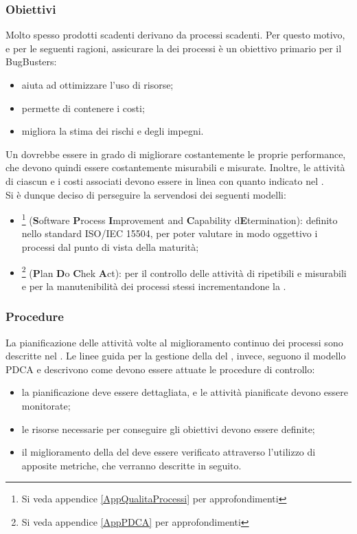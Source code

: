 \subsubsection{Obiettivi}
Molto spesso prodotti scadenti derivano da processi scadenti. Per questo motivo, e per le seguenti ragioni, assicurare la  dei processi è un obiettivo primario per il  BugBusters:
\begin{itemize}
	\item aiuta ad ottimizzare l'uso di risorse;
	\item permette di contenere i costi;
	\item migliora la stima dei rischi e degli impegni.
\end{itemize}
Un  dovrebbe essere in grado di migliorare costantemente le proprie performance, che devono quindi essere costantemente misurabili e misurate. Inoltre, le attività di ciascun  e i costi associati devono essere in linea con quanto indicato nel \PianoDiProgetto. \\
Si è dunque deciso di perseguire la  servendosi dei seguenti modelli: 
\begin{itemize}
	\item {}\footnote{Si veda appendice \ref{AppQualitaProcessi} per approfondimenti} (\textbf{S}oftware \textbf{P}rocess \textbf{I}mprovement and \textbf{C}apability d\textbf{E}termination): definito nello standard ISO/IEC 15504, per poter valutare in modo oggettivo i processi dal punto di vista della maturità;
	\item {}\footnote{Si veda appendice \ref{AppPDCA} per approfondimenti} (\textbf{P}lan \textbf{D}o \textbf{C}hek \textbf{A}ct): per il controllo delle attività di  ripetibili e misurabili e per la manutenibilità dei processi stessi incrementandone la .
\end{itemize}

\subsubsection{Procedure}
La pianificazione delle attività volte al miglioramento continuo dei processi sono descritte nel \PianoDiProgetto. Le linee guida per la gestione della  del , invece, seguono il modello PDCA e descrivono come devono essere attuate le procedure di controllo:
\begin{itemize}
	\item la pianificazione deve essere dettagliata, e le attività pianificate devono essere monitorate;
	\item le risorse necessarie per conseguire gli obiettivi devono essere definite;
	\item il miglioramento della  del  deve essere verificato attraverso l'utilizzo di apposite metriche, che verranno descritte in seguito.
\end{itemize}

